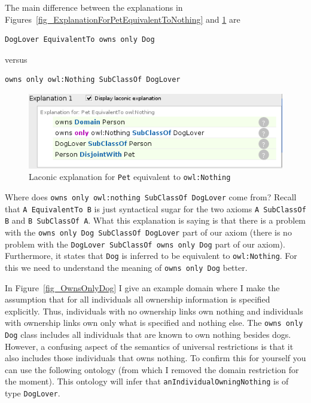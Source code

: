 \documentclass{amsart}
\begin{document}
The main difference between the explanations in Figures~\ref{fig_ExplanationForPetEquivalentToNothing} and \ref{fig_LaconicExplanationForPetEquivalentToNothing} are 

\begin{small}
\begin{verbatim} 
DogLover EquivalentTo owns only Dog
\end{verbatim}
\end{small}

versus

\begin{small}
\begin{verbatim} 
owns only owl:Nothing SubClassOf DogLover
\end{verbatim}
\end{small}

    \begin{figure}
      \centering \includegraphics[trim = 0mm 0mm 0mm 0mm, clip, scale=0.65]{./LaconicExplanationForPetEquivalentToNothing.png}
      \caption{Laconic explanation for \texttt{Pet} equivalent to \texttt{owl:Nothing}}\label{fig_LaconicExplanationForPetEquivalentToNothing}
    \end{figure}


Where does \texttt{owns only owl:nothing SubClassOf DogLover} come from? Recall that \texttt{A EquivalentTo B} is just syntactical sugar for the two axioms \texttt{A SubClassOf B} and \texttt{B SubClassOf A}. What this explanation is saying is that there is a problem with the \texttt{owns only Dog SubClassOf DogLover} part of our axiom (there is no problem with the \texttt{DogLover SubClassOf owns only Dog} part of our axiom). Furthermore, it states that \texttt{Dog} is inferred to be equivalent to \texttt{owl:Nothing}. For this we need to understand the meaning of \texttt{owns only Dog} better. 

In Figure~\ref{fig_OwnsOnlyDog} I give an example domain where I make the assumption that for all individuals all ownership information is specified explicitly. Thus, individuals with no ownership links own nothing and individuals with ownership links own only what is specified and nothing else. The \texttt{owns only Dog} class includes all individuals that are known to own nothing besides dogs. However, a confusing aspect of the semantics of universal restrictions is that it also includes those individuals that owns nothing. To confirm this for yourself you can use the following ontology (from which I removed the domain restriction for the moment). This ontology will infer that \texttt{anIndividualOwningNothing} is of type \texttt{DogLover}.
\end{document}
